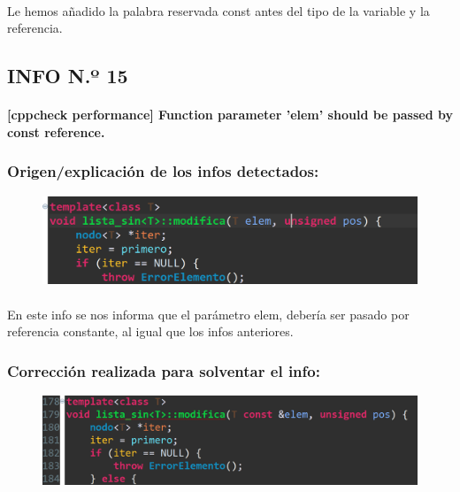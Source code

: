 			\paragraph{}Le hemos añadido la palabra reservada const antes del tipo de la variable y la referencia.
			
	\subsection{INFO N.º 15}
	
		\paragraph{[cppcheck performance] Function parameter 'elem' should be passed by const reference.}
	
		\subsubsection{Origen/explicación de los infos detectados:}
		
			\begin{figure}[H]
				\centering
				\includegraphics[scale=0.55]{img/esteban22.png}
				\label{esteban22}
			\end{figure}
			
			\paragraph{}En este info se nos informa que el parámetro elem, debería ser pasado por referencia constante, al igual que los infos anteriores.
			
		\subsubsection{Corrección realizada para solventar el info:}
		
			\begin{figure}[H]
				\centering
				\includegraphics[scale=0.55]{img/esteban23.png}
				\label{esteban23}
			\end{figure}
		
